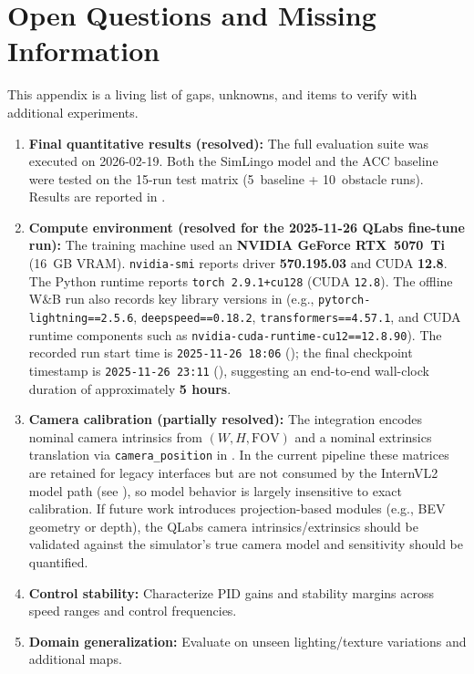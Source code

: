 \chapter{Open Questions and Missing Information}
\label{app:open-questions}

This appendix is a living list of gaps, unknowns, and items to verify with additional experiments.

\begin{enumerate}[leftmargin=*]
  \item \textbf{Final quantitative results (resolved):} The full evaluation suite was executed on 2026-02-19. Both the SimLingo model and the ACC baseline were tested on the 15-run test matrix (5~baseline + 10~obstacle runs). Results are reported in .
  \item \textbf{Compute environment (resolved for the 2025-11-26 QLabs fine-tune run):} The training machine used an \textbf{NVIDIA GeForce RTX~5070~Ti} (16~GB VRAM). \texttt{nvidia-smi} reports driver \textbf{570.195.03} and CUDA \textbf{12.8}. The Python runtime reports \texttt{torch 2.9.1+cu128} (CUDA \texttt{12.8}). The offline W\&B run also records key library versions in  (e.g., \texttt{pytorch-lightning==2.5.6}, \texttt{deepspeed==0.18.2}, \texttt{transformers==4.57.1}, and CUDA runtime components such as \texttt{nvidia-cuda-runtime-cu12==12.8.90}). The recorded run start time is \texttt{2025-11-26 18:06} (); the final checkpoint timestamp is \texttt{2025-11-26 23:11} (), suggesting an end-to-end wall-clock duration of approximately \textbf{5 hours}.
  \item \textbf{Camera calibration (partially resolved):} The integration encodes nominal camera intrinsics from $(W,H,\mathrm{FOV})$ and a nominal extrinsics translation via \texttt{camera\_position} in . In the current pipeline these matrices are retained for legacy interfaces but are not consumed by the InternVL2 model path (see ), so model behavior is largely insensitive to exact calibration. If future work introduces projection-based modules (e.g., BEV geometry or depth), the QLabs camera intrinsics/extrinsics should be validated against the simulator's true camera model and sensitivity should be quantified.
  \item \textbf{Control stability:} Characterize PID gains and stability margins across speed ranges and control frequencies.
  \item \textbf{Domain generalization:} Evaluate on unseen lighting/texture variations and additional maps.
\end{enumerate}
